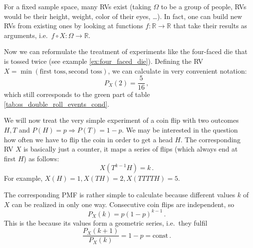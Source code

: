 

For a fixed sample space, many RVs exist (taking $\Omega$ to be a group of people, RVs would be their height, weight, color of their eyes, \dots). In fact, one can build new RVs from existing ones by looking at functions $f: \mathbb{R} \rightarrow \mathbb{R}$ that take their results as arguments, i.e.~$f \circ X: \Omega \rightarrow \mathbb{R}$.


\begin{ex}
Now we can reformulate the treatment of experiments like the four-faced die that is tossed twice (see example \ref{ex:four_faced_die}). Defining the RV $X = \min(\text{first toss}, \text{second toss})$, we can calculate in very convenient notation:
\begin{equation*}
P_X(2) = \frac{5}{16} \, ,
\end{equation*}
which still corresponds to the green part of table \ref{tab:ss_double_roll_events_cond}.
\end{ex}


\begin{ex}\label{ex:coin_flip_rvs}
We will now treat the very simple experiment of a coin flip with two outcomes $H, T$ and $P(H) = p \Rightarrow P(T) = 1 - p$. We may be interested in the question how often we have to flip the coin in order to get a head $H$. The corresponding RV $X$ is basically just a counter, it maps a series of flips (which always end at first $H$) as follows:
\begin{equation*}
X(T^{k - 1} H) = k \, .
\end{equation*}
For example, $X(H) = 1, X(TH) = 2, X(TTTTH) = 5$.

The corresponding PMF is rather simple to calculate because different values $k$ of $X$ can be realized in only one way. Consecutive coin flips are independent, so
\begin{equation*}
P_X(k) = p (1 - p)^{k - 1} \, .
\end{equation*}
This is the  because its values form a geometric series, i.e.~they fulfil
\begin{equation*}
\frac{P_X(k + 1)}{P_X(k)} = 1 - p = \text{const} \, .
\end{equation*}
\end{ex}


